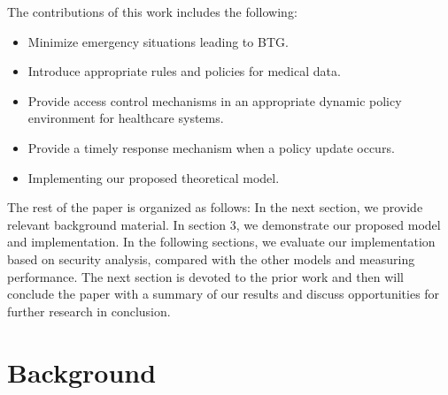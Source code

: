 \documentclass[conference]{IEEEtran}
\begin{document}
The contributions of this work includes the following:
\begin{itemize}
	\item Minimize emergency situations leading to BTG.
	\item Introduce appropriate rules and policies for medical data.
	\item Provide access control mechanisms in an appropriate dynamic policy environment for healthcare systems. 
	\item Provide a timely response mechanism when a policy update occurs.
	\item Implementing our proposed theoretical model.
\end{itemize}

The rest of the paper is organized as follows:
In the next section, we provide relevant background material.
In section 3, we demonstrate our proposed model and implementation.
In the following sections, we evaluate our implementation based on security analysis, compared with the other models and measuring performance.
The next section is devoted to the prior work and then will conclude the paper with a summary of our results and discuss opportunities for further research in conclusion.


\section{Background}\label{sec:back}

\end{document}
